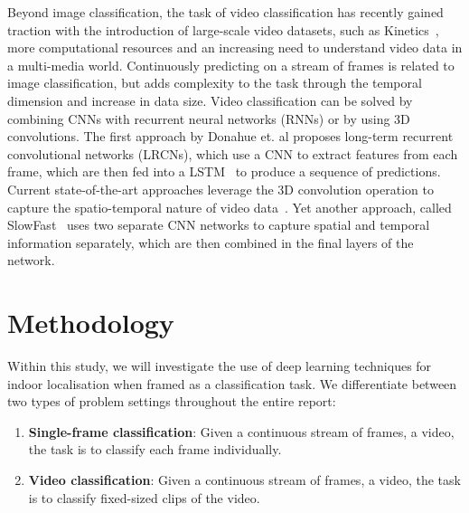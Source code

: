 \documentclass[a4paper]{article}
\begin{document}
Beyond image classification, the task of video classification has recently
gained traction with the introduction of large-scale video datasets, such as
Kinetics~\cite{kinetics}, more computational resources and an increasing need
to understand video data in a multi-media world. Continuously predicting on a
stream of frames is related to image classification, but adds complexity to
the task through the temporal dimension and increase in data size. Video
classification can be solved by combining CNNs with recurrent neural networks
(RNNs) or by using 3D convolutions. The first approach by Donahue et. al
proposes long-term recurrent convolutional networks (LRCNs), which use a CNN
to extract features from each frame, which are then fed into a
LSTM~\cite{lrcn} to produce a sequence of predictions. Current
state-of-the-art approaches leverage the 3D convolution operation to capture
the spatio-temporal nature of video data~\cite{c3d, i3d}. Yet another
approach, called SlowFast~\cite{slowfast} uses two separate CNN networks to
capture spatial and temporal information separately, which are then combined
in the final layers of the network.




\section{Methodology} %
\label{sec:methodology}

Within this study, we will investigate the use of deep learning techniques for
indoor localisation when framed as a classification task. We differentiate
between two types of problem settings throughout the entire report:

\begin{enumerate}

\item \textbf{Single-frame classification}: Given a continuous stream of
  frames, a video, the task is to classify each frame individually.

\item \textbf{Video classification}: Given a continuous stream of frames, a
  video, the task is to classify fixed-sized clips of the video.

\end{enumerate}
\end{document}

